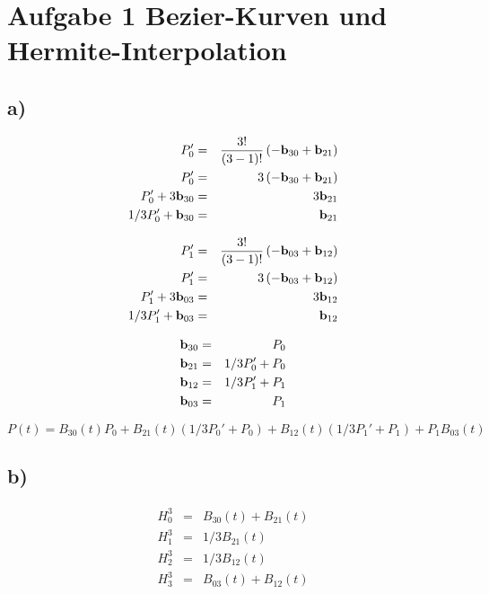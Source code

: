 
\section*{Aufgabe 1 Bezier-Kurven und Hermite-Interpolation}

\subsection*{a)}

\begin{eqnarray}
    P_0' &=& \frac{3!}{(3-1)!} \left( - {\bf b}_{30} + {\bf b}_{21} \right)\\
    P_0' &=& 3 \left( - {\bf b}_{30} + {\bf b}_{21} \right)\\
    P_0'+3{\bf b}_{30} &=& 3 {\bf b}_{21} \\
    1/3 P_0'+{\bf b}_{30} &=& {\bf b}_{21} 
\end{eqnarray}

\begin{eqnarray}
    P_1' &=& \frac{3!}{(3-1)!} \left( - {\bf b}_{03} + {\bf b}_{12} \right)\\
    P_1' &=& 3 \left( - {\bf b}_{03} + {\bf b}_{12} \right)\\
    P_1'+3{\bf b}_{03} &=& 3 {\bf b}_{12} \\
    1/3 P_1'+{\bf b}_{03} &=& {\bf b}_{12} 
\end{eqnarray}



\begin{eqnarray}
    {\bf b}_{30}&=&P_0\\
    {\bf b}_{21}&=&1/3 P_0' + P_0\\
    {\bf b}_{12}&=&1/3 P_1' + P_1\\
    {\bf b}_{03}&=&P_1
\end{eqnarray}

$P(t) = B_{30}(t)P_0 + B_{21}(t)(1/3 P_0' + P_0) + B_{12}(t)(1/3 P_1' + P_1) + P_1 B_{03}(t)$


\subsection*{b)}
\begin{eqnarray}
    H^3_0 &=& B_{30}(t) +B_{21}(t) \\
    H^3_1 &=& 1/3 B_{21}(t)\\
    H^3_2 &=& 1/3 B_{12}(t)\\
    H^3_3 &=& B_{03}(t) +B_{12}(t) \\
\end{eqnarray}

